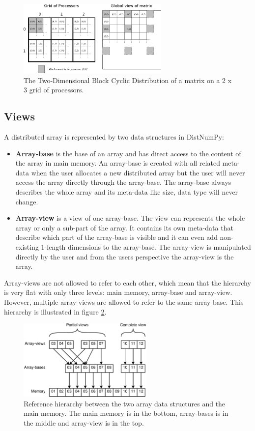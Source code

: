 \documentclass[10pt]{article}
\begin{document}
\begin{figure}
 \centering
 \includegraphics[width=280px]{gfx/datalayout}
 \caption{The Two-Dimensional Block Cyclic Distribution of a matrix on a 2 x 3 grid of processors.}
 \label{fig:datalayout}
\end{figure}


\subsection{Views}
A distributed array is represented by two data structures in DistNumPy:
\begin{itemize}
\item \textbf{Array-base} is the base of an array and has direct access to the content of the array in main memory. An array-base is created with all related meta-data when the user allocates a new distributed array but the user will never access the array directly through the array-base. The array-base always describes the whole array and its meta-data like size, data type will never change.
\item \textbf{Array-view} is a view of one array-base. The view can represents the whole array or only a sub-part of the array. It contains its own meta-data that describe which part of the array-base is visible and it can even add non-existing 1-length dimensions to the array-base. The array-view is manipulated directly by the user and from the users perspective the array-view is the array.
\end{itemize}
Array-views are not allowed to refer to each other, which mean that the hierarchy is very flat with only three levels: main memory, array-base and array-view. However, multiple array-views are allowed to refer to the same array-base. This hierarchy is illustrated in figure \ref{fig:views}. 

\begin{figure}
 \centering
 \includegraphics[width=250px]{gfx/views}
 \caption{Reference hierarchy between the two array data structures and the main memory. The main memory is in the bottom, array-bases is in the middle and array-view is in the top.}
 \label{fig:views}
\end{figure}
\end{document}
